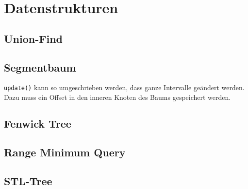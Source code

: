 \section{Datenstrukturen}

\subsection{Union-Find}


\subsection{Segmentbaum}

\lstinline{update()} kann so umgeschrieben werden, dass ganze Intervalle geändert werden.
Dazu muss ein Offset in den inneren Knoten des Baums gespeichert werden.

\subsection{Fenwick Tree}



\subsection{Range Minimum Query}


\subsection{STL-Tree}

